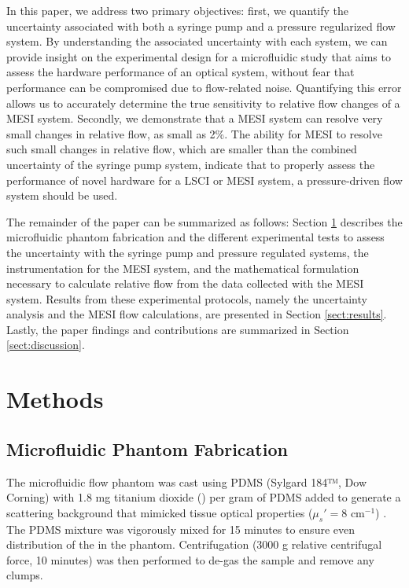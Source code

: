\documentclass[12pt]{spieman}
\begin{document}
\begin{spacing}{2}
In this paper, we address two primary objectives: first, we quantify the uncertainty associated with both a syringe pump and a pressure regularized flow system. By understanding the associated uncertainty with each system, we can provide insight on the experimental design for a microfluidic study that aims to assess the hardware performance of an optical system, without fear that performance can be compromised due to flow-related noise. Quantifying this error allows us to accurately determine the true sensitivity to relative flow changes of a MESI system. Secondly, we demonstrate that a MESI system can resolve very small changes in relative flow, as small as 2\%. The ability for MESI to resolve such small changes in relative flow, which are smaller than the combined uncertainty of the syringe pump system, indicate that to properly assess the performance of novel hardware for a LSCI or MESI system, a pressure-driven flow system should be used.

The remainder of the paper can be summarized as follows: Section \ref{sect:methods} describes the microfluidic phantom fabrication and the different experimental tests to assess the uncertainty with the syringe pump and pressure regulated systems, the instrumentation for the MESI system, and the mathematical formulation necessary to calculate relative flow from the data collected with the MESI system. Results from these experimental protocols, namely the uncertainty analysis and the MESI flow calculations, are presented in Section \ref{sect:results}. Lastly, the paper findings and contributions are summarized in Section \ref{sect:discussion}.


\section{Methods}
\label{sect:methods}

\subsection{Microfluidic Phantom Fabrication}
The microfluidic flow phantom was cast using PDMS (Sylgard 184™, Dow Corning) with 1.8 mg titanium dioxide () per gram of PDMS added to generate a scattering background that mimicked tissue optical properties ($\mu_s' = 8$ cm$^{-1}$) \cite{Parthasarathy:2008el,Yaroslavsky:2002tg}. The PDMS  mixture was vigorously mixed for 15 minutes to ensure even distribution of the  in the phantom. Centrifugation (3000 g relative centrifugal force, 10 minutes) was then performed to de-gas the sample and remove any  clumps.


\end{spacing}
\end{document}

